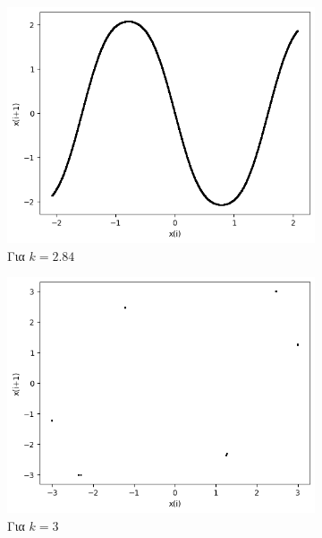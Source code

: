 \begin{figure}[ht]
\begin{subfigure}[b]{0.4\textwidth}
		\includegraphics[width=\textwidth]{LateX images/sine q=-0.5/g19}
		\caption{Για $k=2.84$}
		\label{f:k129}
	\end{subfigure}
	\hfill
	\begin{subfigure}[b]{0.4\textwidth}
		\centering
		\includegraphics[width=\textwidth]{LateX images/sine q=-0.5/g18}
		\caption{Για $k=3$}
		\label{f:k130}
	\end{subfigure}
	\hfill
	\begin{subfigure}[b]{0.4\textwidth}
		\centering

\end{subfigure}
\end{figure}
